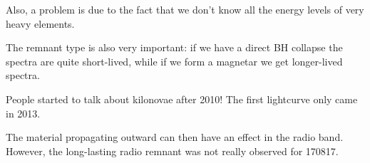 \documentclass[main.tex]{subfiles}
\begin{document}
Also, a problem is due to the fact that we don't know all the energy levels of 
very heavy elements. 

The remnant type is also very important: if we have a direct BH collapse the 
spectra are quite short-lived, while if we form a magnetar
we get longer-lived spectra. 

People started to talk about kilonovae after 2010! 
The first lightcurve only came in 2013. 


The material propagating outward can then have an effect in the radio band. 
However, the long-lasting radio remnant was not really observed for 170817. 

\end{document}
